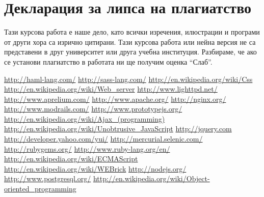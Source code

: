 \documentclass[a4paper]{article}
\begin{document}
\newpage

\section{Декларация за липса на плагиатство}
Тази курсова работа е наше дело, като всички изречения, илюстрации и програми от други хора са изрично цитирани.
Тази курсова работа или нейна версия не са представени в друг университет или друга учебна институция.
Разбираме, че ако се установи плагиатство в работата ни ще получим оценка “Слаб”.

\newpage

\begin{thebibliography}{99}
   \url{http://haml-lang.com/}
   \url{http://sass-lang.com/}
   \url{http://en.wikipedia.org/wiki/Css}
   \url{http://en.wikipedia.org/wiki/Web\_server}
   \url{http://www.lighttpd.net/}
   \url{http://www.aprelium.com/}
   \url{http://www.apache.org/}
   \url{http://nginx.org/}
   \url{http://www.modrails.com/}
   \url{http://www.prototypejs.org/}
   \url{http://en.wikipedia.org/wiki/Ajax\_(programming)}
   \url{http://en.wikipedia.org/wiki/Unobtrusive\_JavaScript}
   \url{http://jquery.com}
   \url{http://developer.yahoo.com/yui/}
   \url{http://mercurial.selenic.com/}
   \url{http://rubygems.org/}
   \url{http://www.ruby-lang.org/en/}
   \url{http://en.wikipedia.org/wiki/ECMAScript}
   \url{http://en.wikipedia.org/wiki/WEBrick}
   \url{http://nodejs.org/}
   \url{http://www.postgresql.org/}
   \url{http://en.wikipedia.org/wiki/Object-oriented\_programming}
\end{thebibliography}
\end{document}
